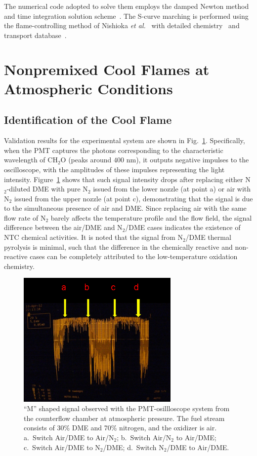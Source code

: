 The numerical code adopted to solve them employs the damped Newton method and time integration solution scheme~\cite{smooke88}.  The S-curve marching is performed using the flame-controlling method of Nishioka \emph{et al.}~\cite{nishioka96} with detailed chemistry~\cite{kee89} and transport database~\cite{kee83}.

\section{Nonpremixed Cool Flames at Atmospheric Conditions}
\subsection{Identification of the Cool Flame} \label{sec:NTC-4.1}

Validation results for the experimental system are shown in Fig.~\ref{fig:M}.  Specifically, when the PMT captures the photons corresponding to the characteristic wavelength of CH$_2$O (peaks around $400$ nm), it outputs negative impulses to the oscilloscope, with the amplitudes of these impulses representing the light intensity.  Figure~\ref{fig:M} shows that such signal intensity drops after replacing either N$_2$-diluted DME with pure N$_2$ issued from the lower nozzle (at point a) or air with N$_2$ issued from the upper nozzle (at point c), demonstrating that the signal is due to the simultaneous presence of air and DME.  Since replacing air with the same flow rate of N$_2$ barely affects the temperature profile and the flow field, the signal difference between the air/DME and N$_2$/DME cases indicates the existence of NTC chemical activities.  It is noted that the signal from N$_2$/DME thermal pyrolysis is minimal, such that the difference in the chemically reactive and non-reactive cases can be completely attributed to the low-temperature oxidation chemistry.  

\begin{figure}[t]
  \centering
  \scriptsize
  \includegraphics[width=0.7\textwidth]{ch-NTC/M.png}
  \normalsize
  \caption{``M'' shaped signal observed with the PMT-osillloscope system from the counterflow chamber at atmospheric pressure.  The fuel stream consists of 30\% DME and 70\% nitrogen, and the oxidizer is air.  a.~Switch Air/DME to Air/N$_2$; b.~Switch Air/N$_2$ to Air/DME; c.~Switch Air/DME to N$_2$/DME; d.~Switch N$_2$/DME to Air/DME.}
  \label{fig:M}
\end{figure}

